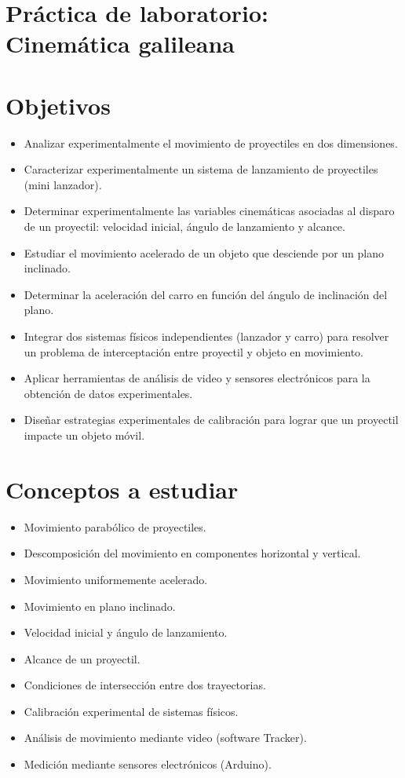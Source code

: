 \section*{Práctica de laboratorio: Cinemática galileana}

\section*{Objetivos}

\begin{itemize}
\item Analizar experimentalmente el movimiento de proyectiles en dos dimensiones.
\item Caracterizar experimentalmente un sistema de lanzamiento de proyectiles (mini lanzador).
\item Determinar experimentalmente las variables cinemáticas asociadas al disparo de un proyectil: velocidad inicial, ángulo de lanzamiento y alcance.
\item Estudiar el movimiento acelerado de un objeto que desciende por un plano inclinado.
\item Determinar la aceleración del carro en función del ángulo de inclinación del plano.
\item Integrar dos sistemas físicos independientes (lanzador y carro) para resolver un problema de interceptación entre proyectil y objeto en movimiento.
\item Aplicar herramientas de análisis de video y sensores electrónicos para la obtención de datos experimentales.
\item Diseñar estrategias experimentales de calibración para lograr que un proyectil impacte un objeto móvil.
\end{itemize}

\section*{Conceptos a estudiar}

\begin{itemize}
\item Movimiento parabólico de proyectiles.
\item Descomposición del movimiento en componentes horizontal y vertical.
\item Movimiento uniformemente acelerado.
\item Movimiento en plano inclinado.
\item Velocidad inicial y ángulo de lanzamiento.
\item Alcance de un proyectil.
\item Condiciones de intersección entre dos trayectorias.
\item Calibración experimental de sistemas físicos.
\item Análisis de movimiento mediante video (software Tracker).
\item Medición mediante sensores electrónicos (Arduino).
\end{itemize}

